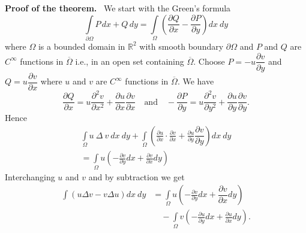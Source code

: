 \noindent
{\bf Proof of the theorem.}~
We start with the Green's formula
$$
\int\limits_{\partial\Omega}P\,dx+Q\,dy=\int\limits_{\Omega}\left(\frac{\partial Q}{\partial x}-\dfrac{\partial P}{\partial y}\right)dx \ dy
$$
where $\Omega$ is a bounded domain in $\mathbb{R}^{2}$ with smooth boundary $\partial \Omega$ and $P$ and $Q$ are $C^{\infty}$ functions in $\overline{\Omega}$ i.e., in an open set containing $\overline{\Omega}$. Choose $P=-u\dfrac{\partial v}{\partial y}$ and $Q=u\dfrac{\partial v}{\partial x}$ where $u$ and $v$ are $C^{\infty}$ functions in $\overline{\Omega}$. We have
$$
\frac{\partial Q}{\partial x}=u\dfrac{\partial^{2}v}{\partial x^{2}}+\frac{\partial u}{\partial x}\dfrac{\partial v}{\partial x}\quad\text{and}\quad -\frac{\partial P}{\partial y}=u\frac{\partial^{2}v}{\partial y^{2}}+\dfrac{\partial u}{\partial y}\dfrac{\partial v}{\partial y}.
$$
Hence
\begin{gather*}
\int\limits_{\Omega}u \ \Delta \ v \ dx \ dy +\int\limits_{\Omega}\left(\frac{\partial u}{\partial x}\cdot \frac{\partial v}{\partial x}+\frac{\partial u}{\partial y}\dfrac{\partial v}{\partial y}\right)dx \ dy\\[4pt]
=\int\limits_{\Omega}u\left(-\frac{\partial v}{\partial y}dx+\frac{\partial v}{\partial x}dy\right)
\end{gather*}
Interchanging $u$ and $v$ and by subtraction we get
\begin{align*}
\int (u \Delta v- v\Delta u)dx \ dy &= \int\limits_{\Omega}u\left(-\frac{\partial v}{\partial y}dx+\dfrac{\partial v}{\partial x}dy\right)\\[4pt]
&\quad - \int\limits_{\Omega}v\left(-\frac{\partial u}{\partial y}dx+\frac{\partial u}{\partial x}dy\right).
\end{align*}

